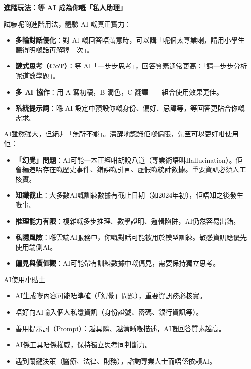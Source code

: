\textbf{進階玩法：等 AI 成為你嘅「私人助理」}\par

試嚇呢啲進階用法，體驗 AI 嘅真正實力：

\begin{itemize}
  \item \textbf{多輪對話優化}：對 AI 嘅回答唔滿意時，可以講「呢個太專業喇，請用小學生聽得明嘅話再解釋一次」。
  \item \textbf{鏈式思考（CoT）}：等 AI「一步步思考」，回答質素通常更高：「請一步步分析呢道數學題」。
  \item \textbf{多 AI 協作}：用 A 寫初稿，B 潤色，C 翻譯——組合使用效果更佳。
  \item \textbf{系統提示詞}：喺 AI 設定中預設你嘅身份、偏好、忌諱等，等回答更貼合你嘅需求。
\end{itemize}


AI雖然強大，但絕非「無所不能」。清醒地認識佢嘅侷限，先至可以更好咁使用佢：

\begin{itemize}
  \item \textbf{「幻覺」問題}：AI可能一本正經咁胡說八道（專業術語叫Hallucination）。佢會編造唔存在嘅歷史事件、錯誤嘅引言、虛假嘅統計數據。重要資訊必須人工核實。
  \item \textbf{知識截止}：大多數AI嘅訓練數據有截止日期（如2024年初），佢唔知之後發生嘅事。
  \item \textbf{推理能力有限}：複雜嘅多步推理、數學證明、邏輯陷阱，AI仍然容易出錯。
  \item \textbf{私隱風險}：喺雲端AI服務中，你嘅對話可能被用於模型訓練。敏感資訊應優先使用端側AI。
  \item \textbf{偏見與價值觀}：AI可能帶有訓練數據中嘅偏見，需要保持獨立思考。
\end{itemize}

\begin{tcbinfo}{AI使用小貼士}
\begin{itemize}
  \item AI生成嘅內容可能唔準確（「幻覺」問題），重要資訊務必核實。
  \item 唔好向AI輸入個人私隱資訊（身份證號、密碼、銀行資訊等）。
  \item 善用提示詞（Prompt）：越具體、越清晰嘅描述，AI嘅回答質素越高。
  \item AI係工具唔係權威，保持獨立思考同判斷力。
  \item 遇到關鍵決策（醫療、法律、財務），諮詢專業人士而唔係依賴AI。
\end{itemize}

\end{tcbinfo}

